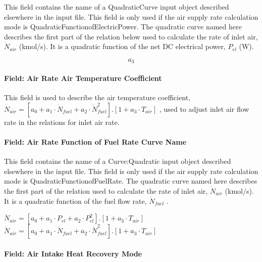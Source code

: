 This field contains the name of a QuadraticCurve input object described elsewhere in the input file. This field is only used if the air supply rate calculation mode is QuadraticFunctionofElectricPower. The quadratic curve named here describes the first part of the relation below used to calculate the rate of inlet air, \({\dot N_{air}}\) (kmol/s). It is a quadratic function of the net DC electrical power, \({P_{el}}\) (W).

\begin{equation}
{a_3}
\end{equation}

\paragraph{Field: Air Rate Air Temperature Coefficient}\label{field-air-rate-air-temperature-coefficient}

This field is used to describe the air temperature coefficient, \({\dot N_{air}} = \left[ {{a_0} + {a_1} \cdot {{\dot N}_{fuel}} + {a_2} \cdot \dot N_{fuel}^2} \right].\left[ {1 + {a_3} \cdot {T_{air}}} \right]\) , used to adjust inlet air flow rate in the relations for inlet air rate.

\paragraph{Field: Air Rate Function of Fuel Rate Curve Name}\label{field-air-rate-function-of-fuel-rate-curve-name}

This field contains the name of a Curve:Quadratic input object described elsewhere in the input file. This field is only used if the air supply rate calculation mode is QuadraticFunctionofFuelRate. The quadratic curve named here describes the first part of the relation used to calculate the rate of inlet air, \({\dot N_{air}}\) (kmol/s). It is a quadratic function of the fuel flow rate, \({\dot N_{fuel}}\) .

\({\dot N_{air}} = \left[ {{a_0} + {a_1} \cdot {P_{el}} + {a_2} \cdot P_{el}^2} \right].\left[ {1 + {a_3} \cdot {T_{air}}} \right]\) \({\dot N_{air}} = \left[ {{a_0} + {a_1} \cdot {{\dot N}_{fuel}} + {a_2} \cdot \dot N_{fuel}^2} \right].\left[ {1 + {a_3} \cdot {T_{air}}} \right]\)

\paragraph{Field: Air Intake Heat Recovery Mode}\label{field-air-intake-heat-recovery-mode}

